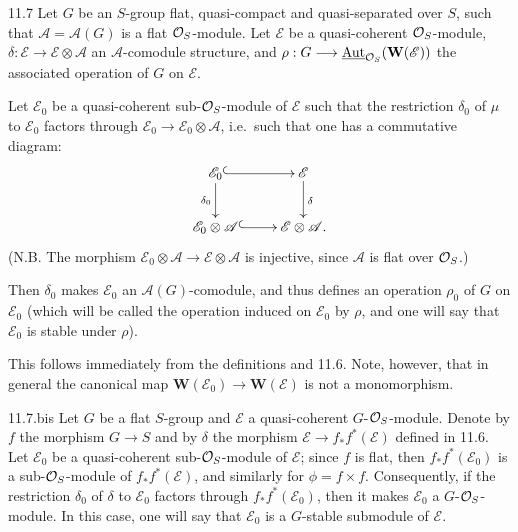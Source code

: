 \begin{lemma}{11.7}\label{VIB.11.7}
Let $G$ be an $S$-group flat, quasi-compact and quasi-separated over $S$, such that $\mathscr A=\mathscr A(G)$ is a flat $\mathcal{O}_S$-module. Let $\mathscr E$ be a quasi-coherent $\mathcal{O}_S$-module, $\delta:\mathscr E\to\mathscr E\otimes\mathscr A$ an $\mathscr A$-comodule structure, and $\rho:G\longrightarrow\underline{\operatorname{Aut}}_{\mathcal{O}_S}(\mathbf W(\mathscr E))$ the associated operation of $G$ on $\mathscr E$.

Let $\mathscr E_0$ be a quasi-coherent sub-$\mathcal{O}_S$-module of $\mathscr E$ such that the restriction $\delta_0$ of $\mu$ to $\mathscr E_0$ factors through $\mathscr E_0\to\mathscr E_0\otimes\mathscr A$, i.e.\ such that one has a commutative diagram:
\[
\xymatrix{\mathscr E_0\ar@{^{(}->}[r]\ar[d]_{\delta_0}&\mathscr E\ar[d]^\delta\\\mathscr E_0\otimes\mathscr A\ar@{^{(}->}[r]&\mathscr E\otimes\mathscr A.}
\]
(N.B. The morphism $\mathscr E_0\otimes\mathscr A\to\mathscr E\otimes\mathscr A$ is injective, since $\mathscr A$ is flat over $\mathcal{O}_S$.)

Then $\delta_0$ makes $\mathscr E_0$ an $\mathscr A(G)$-comodule, and thus defines an operation $\rho_0$ of $G$ on $\mathscr E_0$ (which will be called the operation induced on $\mathscr E_0$ by $\rho$, and one will say that $\mathscr E_0$ is stable under $\rho$).
\end{lemma}
This follows immediately from the definitions and 11.6. Note, however, that in general the canonical map $\mathbf W(\mathscr E_0)\to\mathbf W(\mathscr E)$ is not a monomorphism.

\begin{remark}{11.7.bis}\label{VIB.11.7.bis}
Let $G$ be a flat $S$-group and $\mathscr E$ a quasi-coherent $G$-$\mathcal{O}_S$-module. Denote by $f$ the morphism $G\to S$ and by $\delta$ the morphism $\mathscr E\to f_*f^*(\mathscr E)$ defined in 11.6. Let $\mathscr E_0$ be a quasi-coherent sub-$\mathcal{O}_S$-module of $\mathscr E$; since $f$ is flat, then $f_*f^*(\mathscr E_0)$ is a sub-$\mathcal{O}_S$-module of $f_*f^*(\mathscr E)$, and similarly for $\phi=f\times f$. Consequently, if the restriction $\delta_0$ of $\delta$ to $\mathscr E_0$ factors through $f_*f^*(\mathscr E_0)$, then it makes $\mathscr E_0$ a $G$-$\mathcal{O}_S$-module. In this case, one will say that $\mathscr E_0$ is a $G$-stable submodule of $\mathscr E$.
\end{remark}

